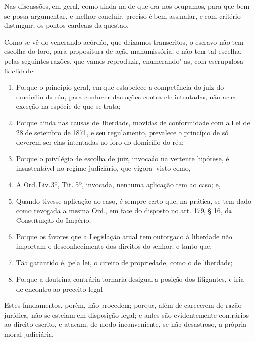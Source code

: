 Nas discussões, em geral, como ainda na de que ora nos ocupamos, para
que bem se possa argumentar, e melhor concluir, preciso é bem assinalar,
e com critério distinguir, os pontos cardeais da questão.

Como se vê do venerando acórdão, que deixamos transcritos, o escravo não
tem escolha do foro, para propositura de ação manumissória; e não tem
tal escolha, pelas seguintes razões, que vamos reproduzir,
enumerando"-as, com escrupulosa fidelidade:

\begin{enumerate}[label=\arabic*º]
\item Porque o princípio geral, em que estabelece a competência do juiz do
domicílio do réu, para conhecer das ações contra ele intentadas, não
acha exceção na espécie de que se trata;

\item Porque ainda nas causas de liberdade, movidas de conformidade com a
Lei de 28 de setembro de 1871, e seu regulamento, prevalece o princípio
de só deverem ser elas intentadas no foro do domicílio do réu;

\item Porque o privilégio de escolha de juiz, invocado na vertente
hipótese, é insustentável no regime judiciário, que vigora; visto como,

\item A Ord.\,Liv.\,3º, Tit. 5º, invocada, nenhuma aplicação tem ao caso; e,

\item Quando tivesse aplicação ao caso, é sempre certo que, na prática, se
tem dado como revogada a mesma Ord., em face do disposto no art. 179, §
16, da Constituição do Império;

\item Porque os favores que a Legislação atual tem outorgado à liberdade
não importam o desconhecimento dos direitos do senhor; e tanto que,

\item Tão garantido é, pela lei, o direito de propriedade, como o de
liberdade;

\item Porque a doutrina contrária tornaria desigual a posição dos
litigantes, e iria de encontro ao preceito legal.
\end{enumerate}

Estes fundamentos, porém, não procedem; porque, além de carecerem de
razão jurídica, não se esteiam em disposição legal; e antes são
evidentemente contrários ao direito escrito, e atacam, de modo
inconveniente, se não desastroso, a própria moral judiciária.

